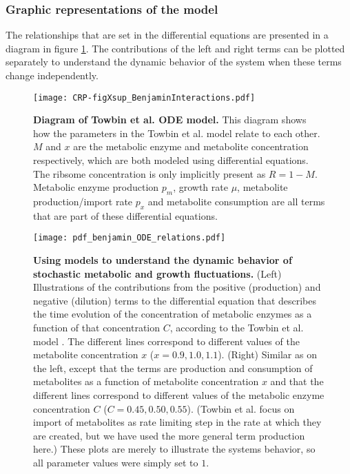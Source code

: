 \subsubsection*{Graphic representations of the model}

The relationships that are set in the differential equations are presented in a diagram in figure \ref{fig:CRP:benjamin_ODEs_diagram}.
%
The contributions of the left and right terms can be plotted separately to understand the dynamic behavior of the system when these terms change independently.

\begin{figure}
	\centering
	\texttt{[image: CRP-figXsup\_BenjaminInteractions.pdf]}
	\caption{ 
		\textbf{Diagram of Towbin et al. ODE model.}
		This diagram shows how the parameters in the Towbin et al. model relate to each other. $M$ and $x$ are the metabolic enzyme and metabolite concentration respectively, which are both modeled using differential equations. The ribsome concentration is only implicitly present as $R=1-M$. Metabolic enzyme production $p_m$, growth rate $\mu$, metabolite production/import rate $p_x$ and metabolite consumption are all terms that are part of these differential equations.
	}
	\label{fig:CRP:benjamin_ODEs_diagram}
\end{figure}


\begin{figure}
	\centering
	\texttt{[image: pdf\_benjamin\_ODE\_relations.pdf]}
	\caption{ 
		\textbf{Using models to understand the dynamic behavior of stochastic metabolic and growth fluctuations.}
		(Left) Illustrations of the contributions from the positive (production) and negative (dilution) terms to the differential equation that describes the time evolution of the concentration of metabolic enzymes as a function of that concentration $C$, according to the Towbin et al. model \cite{Towbin2017}. The different lines correspond to different values of the metabolite concentration $x$ ($x={0.9, 1.0, 1.1}$). 
		(Right)	Similar as on the left, except that the terms are production and consumption of metabolites as a function of metabolite concentration $x$ and that the different lines correspond to different values of the metabolic enzyme concentration $C$ ($C={0.45,0.50,0.55}$). (Towbin et al. focus on import of metabolites as rate limiting step in the rate at which they are created, but we have used the more general term production here.) 
		These plots are merely to illustrate the systems behavior, so all parameter values were simply set to $1$.
	}
	\label{fig:CRP:benjamin_ODEs}
\end{figure}





